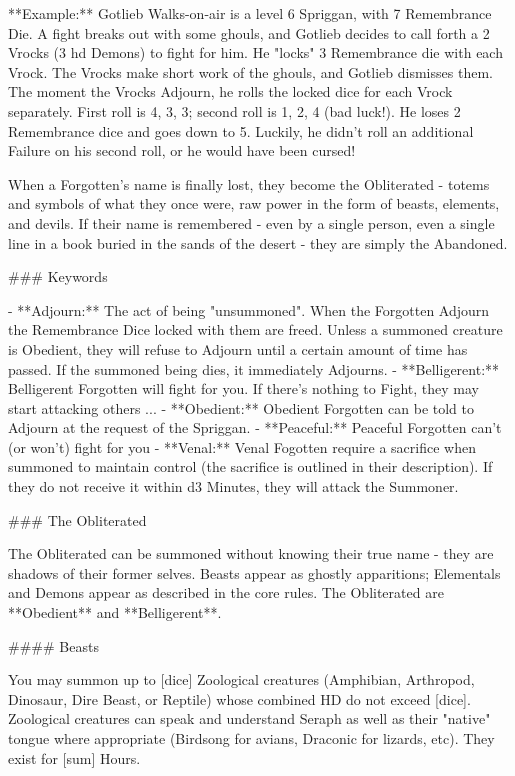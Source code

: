 **Example:** Gotlieb Walks-on-air is a level 6 Spriggan, with 7 Remembrance Die.  A fight breaks out with some ghouls, and Gotlieb decides to call forth a 2 Vrocks (3 {hd} Demons) to fight for him.  He "locks" 3 Remembrance die with each Vrock.  The Vrocks make short work of the ghouls, and Gotlieb dismisses them.  The moment the Vrocks Adjourn, he rolls the locked dice for each Vrock separately.  First roll is 4, 3, 3; second roll is 1, 2, 4 (bad luck!).  He loses 2 Remembrance dice and goes down to 5.  Luckily, he didn't roll an additional Failure on his second roll, or he would have been cursed!










When a Forgotten's name is finally lost, they become the Obliterated - totems and symbols of what they once were, raw power in the form of beasts, elements, and devils.  If their name is remembered - even by a single person, even a single line in a book buried in the sands of the desert - they are simply the Abandoned.



### Keywords

- **Adjourn:**  The act of being "unsummoned".  When the Forgotten Adjourn the Remembrance Dice locked with them are freed.  Unless a summoned creature is Obedient, they will refuse to Adjourn until a certain amount of time has passed.  If the summoned being dies, it immediately Adjourns.
- **Belligerent:** Belligerent Forgotten will fight for you.  If there's nothing to Fight, they may start attacking others ...
- **Obedient:** Obedient Forgotten can be told to Adjourn at the request of the Spriggan.
- **Peaceful:** Peaceful Forgotten can't (or won't) fight for you
- **Venal:** Venal Fogotten require a sacrifice when summoned to maintain control (the sacrifice is outlined in their description).  If they do not receive it within d3 Minutes, they will attack the Summoner.


### The Obliterated

The Obliterated can be summoned without knowing their true name - they are shadows of their former selves.  Beasts appear as ghostly apparitions; Elementals and Demons appear as described in the core rules.  The Obliterated are **Obedient** and **Belligerent**.

#### Beasts

You may summon up to [dice] Zoological creatures (Amphibian, Arthropod, Dinosaur, Dire Beast, or Reptile) whose combined HD do not exceed [dice].  Zoological creatures can speak and understand Seraph as well as their "native" tongue where appropriate (Birdsong for avians, Draconic for lizards, etc).  They exist for [sum] Hours. 


